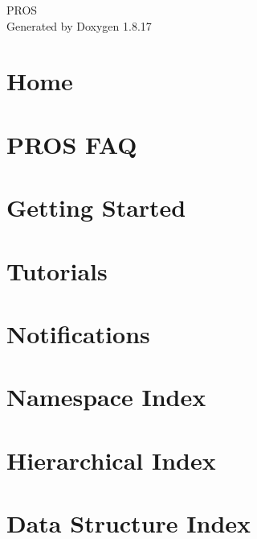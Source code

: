 \let\mypdfximage\pdfximage\def\pdfximage{\immediate\mypdfximage}\documentclass[twoside]{book}
\newcommand{\+}{\discretionary{\mbox{\scriptsize$\hookleftarrow$}}{}{}}
\newcommand{\clearemptydoublepage}{%
  \newpage{\pagestyle{empty}\cleardoublepage}%
}
\begin{document}
\hypersetup{pageanchor=false,
             bookmarksnumbered=true,
             pdfencoding=unicode
            }
\begin{titlepage}
\vspace*{7cm}
\begin{center}%
{\Large P\+R\+OS }\\
\vspace*{1cm}
{\large Generated by Doxygen 1.8.17}\\
\end{center}
\end{titlepage}
\clearemptydoublepage
{}
\tableofcontents
\clearemptydoublepage
{}
\hypersetup{pageanchor=true}

\chapter{Home}
\label{index}\hypertarget{index}{}
\chapter{P\+R\+OS F\+AQ}
\label{md_docs_getting-started_faq}

\chapter{Getting Started}
\label{getting-started}

\chapter{Tutorials}
\label{tutorials}

\chapter{Notifications}
\label{notifications}

\chapter{Namespace Index}

\chapter{Hierarchical Index}

\chapter{Data Structure Index}

\end{document}
